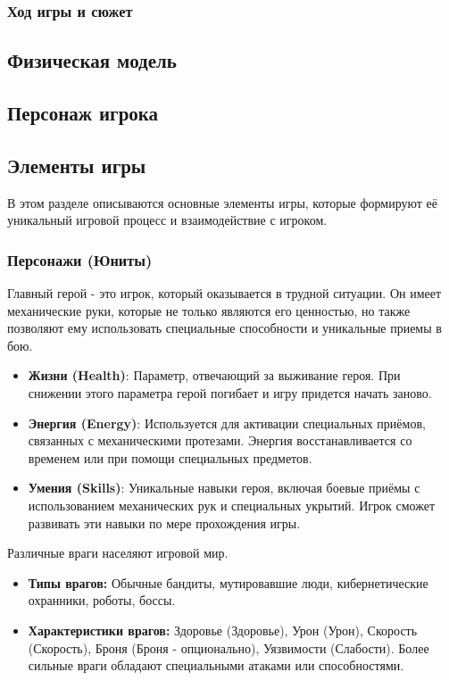 \documentclass{article}
\begin{document}
\subsubsection{Ход игры и сюжет}

\subsection{Физическая модель}

\subsection{Персонаж игрока}

\subsection{Элементы игры}

В этом разделе описываются основные элементы игры, которые формируют её уникальный игровой процесс и взаимодействие с игроком.
\subsubsection{Персонажи (Юниты)}
Главный герой - это игрок, который оказывается в трудной ситуации. Он имеет механические руки, которые не только являются его ценностью, но также позволяют ему использовать специальные способности и уникальные приемы в бою.
\begin{itemize}
   \item \textbf{Жизни (Health)}: Параметр, отвечающий за выживание героя. При снижении этого параметра герой погибает и игру придется начать заново.
    \item \textbf{Энергия (Energy)}: Используется для активации специальных приёмов, связанных с механическими протезами. Энергия восстанавливается со временем или при помощи специальных предметов.
    \item \textbf{Умения (Skills)}: Уникальные навыки героя, включая боевые приёмы с использованием механических рук и специальных укрытий. Игрок сможет развивать эти навыки по мере прохождения игры.

\end{itemize}
Различные враги населяют игровой мир.

\begin{itemize} 
     \item \textbf{Типы врагов:} Обычные бандиты, мутировавшие люди, кибернетические охранники, роботы, боссы. 
     \item \textbf{Характеристики врагов:} Здоровье (Здоровье), Урон (Урон), Скорость (Скорость), Броня (Броня - опционально), Уязвимости (Слабости). Более сильные враги обладают специальными атаками или способностями.
\end{itemize}
\end{document}
